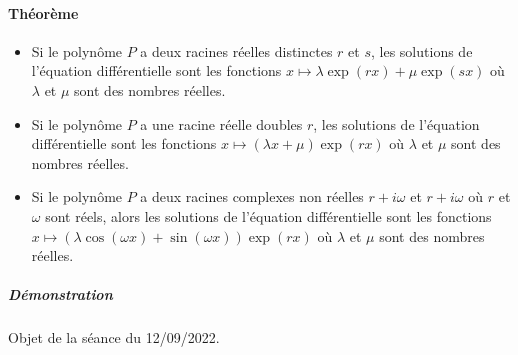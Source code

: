 \documentclass[10pt,a4paper]{article}
\begin{document}
\paragraph{Théorème}
\begin{itemize}
\item
Si le polynôme $P$ a deux racines réelles distinctes $r$ et $s$, les solutions de l'équation différentielle sont les fonctions $x\mapsto \lambda \exp(rx) + \mu \exp(sx)$ où $\lambda$ et $\mu$ sont des nombres réelles.
\item
Si le polynôme $P$ a une racine réelle doubles $r$, les solutions de l'équation différentielle sont les fonctions $x\mapsto (\lambda x+ \mu )\exp(rx)$ où $\lambda$ et $\mu$ sont des nombres réelles.
\item
Si le polynôme $P$ a deux racines complexes non réelles $r+i\omega$ et $r+i\omega$ où $r$ et $\omega$ sont réels, alors les solutions de l'équation différentielle sont les fonctions $x\mapsto (\lambda \cos(\omega x) + \sin(\omega x) ) \exp(rx)$ où $\lambda$ et $\mu$ sont des nombres réelles. 
\end{itemize}
\subparagraph{Démonstration}
Objet de la séance du 12/09/2022.
\end{document}
